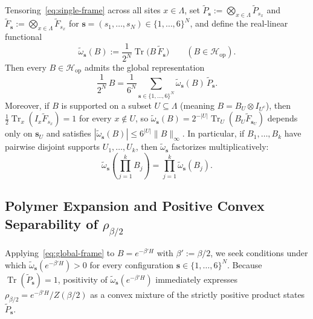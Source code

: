 \documentclass[11pt,a4paper]{article}
\numberwithin{equation}{section}
\theoremstyle{plain}
\theoremstyle{definition}
\newcommand{\Hop}{\mathcal{H}_{\mathrm{op}}}
\newcommand{\Tr}{\operatorname{Tr}}
\begin{document}
Tensoring~\eqref{eq:single-frame} across all sites $x\in\Lambda$, set $\widetilde{P}_{\mathbf{s}} := \bigotimes_{x\in\Lambda}\widetilde{P}_{s_x}$ and $\widetilde{F}_{\mathbf{s}} := \bigotimes_{x\in\Lambda}\widetilde{F}_{s_x}$ for $\mathbf{s} = (s_1,\dots,s_N)\in\{1,\dots,6\}^N$, and define the real-linear functional
\begin{equation}\label{eq:omegatilde-def}
  \widetilde{\omega}_{\mathbf{s}}(B) := \frac{1}{2^N}\Tr\bigl(B\,\widetilde{F}_{\mathbf{s}}\bigr) \qquad (B\in\Hop).
\end{equation}
Then every $B\in\Hop$ admits the global representation
\begin{equation}\label{eq:global-frame}
  \frac{1}{2^N}\,B = \frac{1}{6^N}\sum_{\mathbf{s}\in\{1,\dots,6\}^N} \widetilde{\omega}_{\mathbf{s}}(B)\,\widetilde{P}_{\mathbf{s}}.
\end{equation}
Moreover, if $B$ is supported on a subset $U\subseteq\Lambda$ (meaning $B = B_U\otimes I_{U^c}$), then $\frac{1}{2}\Tr_x(I_x\widetilde{F}_{s_x}) = 1$ for every $x\notin U$, so $\widetilde{\omega}_{\mathbf{s}}(B) = 2^{-|U|}\Tr_U(B_U\widetilde{F}_{\mathbf{s}_U})$ depends only on $\mathbf{s}_U$ and satisfies $|\widetilde{\omega}_{\mathbf{s}}(B)| \le 6^{|U|}\|B\|_\infty$. In particular, if $B_1,\dots,B_k$ have pairwise disjoint supports $U_1,\dots,U_k$, then $\widetilde{\omega}_{\mathbf{s}}$ factorizes multiplicatively:
\begin{equation}\label{eq:omegatilde-factor}
  \widetilde{\omega}_{\mathbf{s}}\!\left(\prod_{j=1}^k B_j\right) = \prod_{j=1}^k \widetilde{\omega}_{\mathbf{s}}(B_j).
\end{equation}

\subsection{Polymer Expansion and Positive Convex Separability of $\rho_{\beta/2}$}\label{subsec:polymer}

Applying~\eqref{eq:global-frame} to $B = e^{-\beta' H}$ with $\beta' := \beta/2$, we seek conditions under which $\widetilde{\omega}_{\mathbf{s}}(e^{-\beta' H}) > 0$ for every configuration $\mathbf{s}\in\{1,\dots,6\}^N$. Because $\Tr(\widetilde{P}_{\mathbf{s}}) = 1$, positivity of $\widetilde{\omega}_{\mathbf{s}}(e^{-\beta' H})$ immediately expresses $\rho_{\beta/2} = e^{-\beta' H}/Z(\beta/2)$ as a convex mixture of the strictly positive product states $\widetilde{P}_{\mathbf{s}}$.
\end{document}
